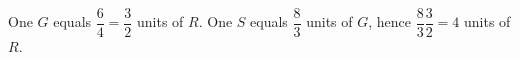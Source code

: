 One $G$ equals $\dfrac{6}{4}=\dfrac{3}{2}$ units of $R$. One $S$ equals $\dfrac{8}{3}$ units of $G$, hence $\dfrac{8}{3}\dfrac{3}{2}=\boxed4$ units of $R$.
